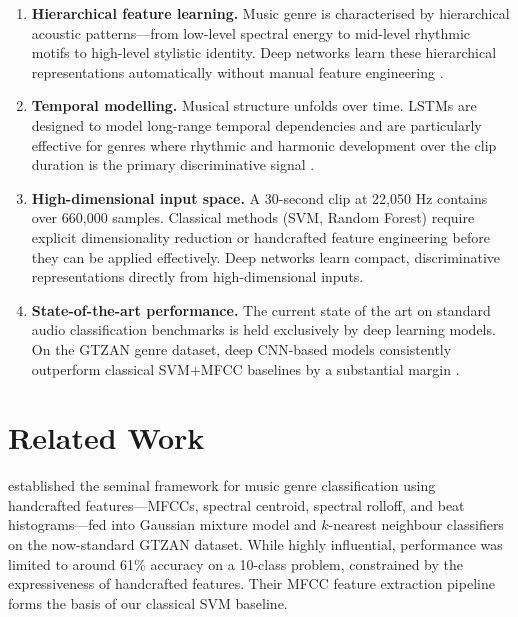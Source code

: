 \documentclass[12pt, a4paper]{article}
\begin{document}
\begin{enumerate}[topsep=4pt]
    \item \textbf{Hierarchical feature learning.}
    Music genre is characterised by hierarchical acoustic patterns---from low-level
    spectral energy to mid-level rhythmic motifs to high-level stylistic identity.
    Deep networks learn these hierarchical representations automatically without manual
    feature engineering \citep{lecun2015deep}.

    \item \textbf{Temporal modelling.}
    Musical structure unfolds over time. LSTMs are designed to model long-range temporal
    dependencies and are particularly effective for genres where rhythmic and harmonic
    development over the clip duration is the primary discriminative signal
    \citep{choi2017crnn}.

    \item \textbf{High-dimensional input space.}
    A 30-second clip at 22{,}050 Hz contains over 660{,}000 samples. Classical methods
    (SVM, Random Forest) require explicit dimensionality reduction or handcrafted feature
    engineering before they can be applied effectively. Deep networks learn compact,
    discriminative representations directly from high-dimensional inputs.

    \item \textbf{State-of-the-art performance.}
    The current state of the art on standard audio classification benchmarks is held
    exclusively by deep learning models. On the GTZAN genre dataset, deep CNN-based
    models consistently outperform classical SVM+MFCC baselines by a substantial margin
    \citep{choi2017convolutional}.
\end{enumerate}

\section{Related Work}
\label{sec:litreview}

\citet{tzanetakis2002musical} established the seminal framework for music genre
classification using handcrafted features---MFCCs, spectral centroid, spectral rolloff,
and beat histograms---fed into Gaussian mixture model and $k$-nearest neighbour
classifiers on the now-standard GTZAN dataset. While highly influential, performance was
limited to around 61\% accuracy on a 10-class problem, constrained by the expressiveness
of handcrafted features. Their MFCC feature extraction pipeline forms the basis of our
classical SVM baseline.
\end{document}
